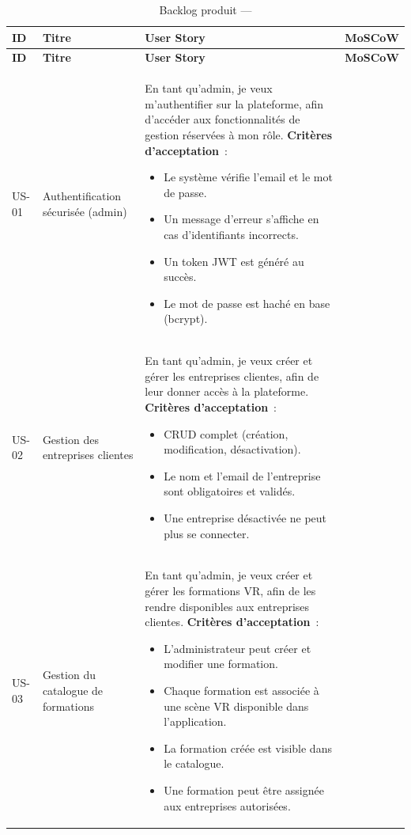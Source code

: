 \begin{longtable}{lp{2.8cm}p{8cm}l}
  \toprule
  \textbf{ID} & \textbf{Titre} & \textbf{User Story} & \textbf{MoSCoW} \\
  \midrule
  \endfirsthead
  \toprule
  \textbf{ID} & \textbf{Titre} & \textbf{User Story} & \textbf{MoSCoW} \\
  \midrule
  \endhead
  \endfoot
  \bottomrule
  \caption{Backlog produit --- \tynassit{}}
  \label{tab:backlog}
  \endlastfoot

  US-01 & Authentification sécurisée (admin) &
    En tant qu'admin, je veux m'authentifier sur la plateforme, afin
    d'accéder aux fonctionnalités de gestion réservées à mon rôle.
    \newline\textbf{Critères d'acceptation}~:
    \begin{itemize}
      \item Le système vérifie l'email et le mot de passe.
      \item Un message d'erreur s'affiche en cas d'identifiants incorrects.
      \item Un token JWT est généré au succès.
      \item Le mot de passe est haché en base (bcrypt).
    \end{itemize}
    & \must{} \\[4pt]

  US-02 & Gestion des entreprises clientes &
    En tant qu'admin, je veux créer et gérer les entreprises clientes,
    afin de leur donner accès à la plateforme.
    \newline\textbf{Critères d'acceptation}~:
    \begin{itemize}
      \item CRUD complet (création, modification, désactivation).
      \item Le nom et l'email de l'entreprise sont obligatoires et validés.
      \item Une entreprise désactivée ne peut plus se connecter.
    \end{itemize}
    & \must{} \\[4pt]

  US-03 & Gestion du catalogue de formations &
  En tant qu'admin, je veux créer et gérer les formations VR,
  afin de les rendre disponibles aux entreprises clientes.
  \newline\textbf{Critères d'acceptation}~:
  \begin{itemize}
    \item L'administrateur peut créer et modifier une formation.
    \item Chaque formation est associée à une scène VR disponible dans l'application.
    \item La formation créée est visible dans le catalogue.
    \item Une formation peut être assignée aux entreprises autorisées.
  \end{itemize}
  & \must{} \\[4pt]


\end{longtable}
